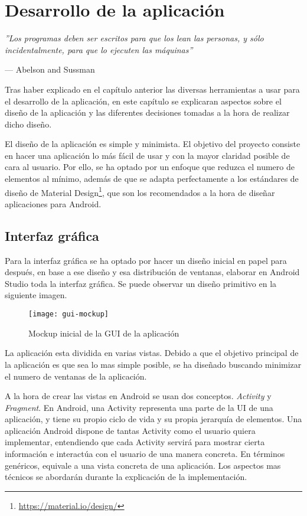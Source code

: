 \chapter{Desarrollo de la aplicación}

\epigraph{\textit{''Los programas deben ser escritos para que los lean las personas, y sólo incidentalmente, para que lo ejecuten las máquinas''}}{--- Abelson and Sussman}

Tras haber explicado en el capítulo anterior las diversas herramientas a usar para el desarrollo de la aplicación, en este capítulo se explicaran aspectos sobre el diseño de la aplicación y las diferentes decisiones tomadas a la hora de realizar dicho diseño.

El diseño de la aplicación es simple y minimista. El objetivo del proyecto consiste en hacer una aplicación lo más fácil de usar y con la mayor claridad posible de cara al usuario. Por ello, se ha optado por un enfoque que reduzca el numero de elementos al mínimo, además de que se adapta perfectamente a los estándares de diseño de Material Design\footnote{\url{https://material.io/design/}}, que son los recomendados a la hora de diseñar aplicaciones para Android.

\section{Interfaz gráfica}

Para la interfaz gráfica se ha optado por hacer un diseño inicial en papel para después, en base a ese diseño y esa distribución de ventanas, elaborar en Android Studio toda la interfaz gráfica. Se puede observar un diseño primitivo en la siguiente imagen.

\begin{figure}[ht]
	\centering
	\texttt{[image: gui-mockup]}
	\caption{Mockup inicial de la GUI de la aplicación}
	\label{fig:mockup}
\end{figure}

La aplicación esta dividida en varias vistas. Debido a que el objetivo principal de la aplicación es que sea lo mas simple posible, se ha diseñado buscando minimizar el numero de ventanas de la aplicación.

A la hora de crear las vistas en Android se usan dos conceptos. \textit{Activity} y \textit{Fragment}. En Android, una Activity representa una parte de la UI de una aplicación, y tiene su propio ciclo de vida y su propia jerarquía de elementos. Una aplicación Android dispone de tantas Activity como el usuario quiera implementar, entendiendo que cada Activity servirá para mostrar cierta información e interactúa con el usuario de una manera concreta. En términos genéricos, equivale a una vista concreta de una aplicación. Los aspectos mas técnicos se abordarán durante la explicación de la implementación.

